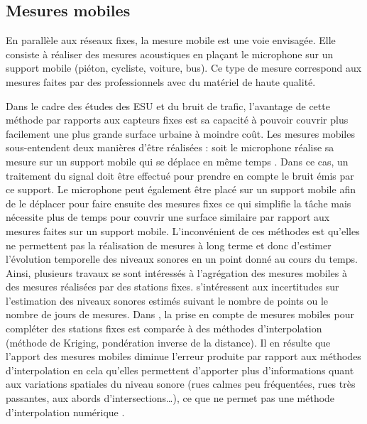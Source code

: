 
\subsection{Mesures mobiles}

En parallèle aux réseaux fixes, la mesure mobile est une voie envisagée. Elle consiste à réaliser des mesures acoustiques en plaçant le microphone sur un support mobile (piéton, cycliste, voiture, bus). Ce type de mesure correspond aux mesures faites par des professionnels avec du matériel de haute qualité. 

Dans le cadre des études des ESU et du bruit de trafic, l'avantage de cette méthode par rapports aux capteurs fixes est sa capacité à pouvoir couvrir plus facilement une plus grande surface urbaine à moindre coût. Les mesures mobiles sous-entendent deux manières d'être réalisées : soit le microphone réalise sa mesure sur un support mobile qui se déplace en même temps \cite{alsina-pages_design_2016}. Dans ce cas, un traitement du signal doit être effectué pour prendre en compte le bruit émis par ce support. 
Le microphone peut également être placé sur un support mobile afin de le déplacer pour faire ensuite des mesures fixes \cite{manvell2004sadmam} ce qui simplifie la tâche mais nécessite plus de temps pour couvrir une surface similaire par rapport aux mesures faites sur un support mobile. 
L'inconvénient de ces méthodes est qu'elles ne permettent pas la réalisation de mesures à long terme et donc d'estimer l'évolution temporelle des niveaux sonores en un point donné au cours du temps.
Ainsi, plusieurs travaux se sont intéressés à l'agrégation des mesures mobiles à des mesures réalisées par des stations fixes.
\cite{morillas2014uncertainty} s'intéressent aux incertitudes sur l'estimation des niveaux sonores estimés suivant le nombre de points ou le nombre de jours de mesures. Dans \cite{can_measurement_2014}, la prise en compte de mesures mobiles pour compléter des stations fixes est comparée à des méthodes d'interpolation (méthode de Kriging, pondération inverse de la distance). Il en résulte que l'apport des mesures mobiles diminue l'erreur produite par rapport aux méthodes d'interpolation en cela qu'elles permettent d'apporter plus d'informations quant aux variations spatiales du niveau sonore (rues calmes peu fréquentées, rues très passantes, aux abords d'intersections\dots), ce que ne permet pas une méthode d'interpolation numérique \cite{aumond2018kriging}.

